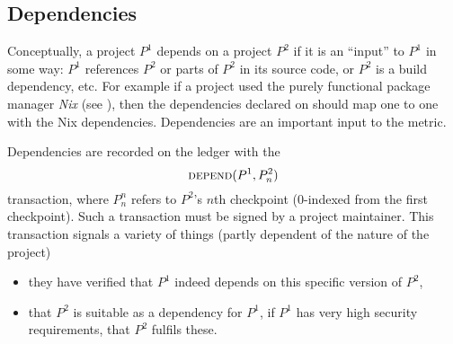 \subsection{Dependencies}
\label{s:dependencies}

Conceptually, a project $P^1$ depends on a project $P^2$ if it is an
``input'' to $P^1$ in some way: $P^1$ references $P^2$ or parts of
$P^2$ in its source code, or $P^2$ is a build dependency, etc. For
example if a project used the purely functional package manager
\emph{Nix} (see \cite{nix}), then the dependencies declared on
\oscoin{} should map one to one with the Nix
dependencies. Dependencies are an important input to the \osrank{}
metric.

Dependencies are recorded on the ledger with the
\[
    \text{\normalfont\scshape depend}\small{\lparen P^1, P^2_n\rparen}
\]
transaction, where $P^n_n$ refers to $P^2$'s $n$th checkpoint
($0$-indexed from the first checkpoint). Such a transaction must be
signed by a project maintainer. This transaction signals a variety of
things (partly dependent of the nature of the project)
\begin{itemize}
\item they have verified that $P^1$ indeed depends on this specific
  version of $P^2$,
\item that $P^2$ is suitable as a dependency for $P^1$, \eg{} if $P^1$
  has very high security requirements, that $P^2$ fulfils these.
\end{itemize}

